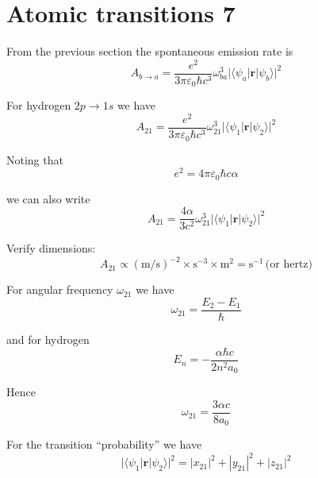 

\section*{Atomic transitions 7}

From the previous section the spontaneous emission rate is
\begin{equation*}
A_{b\rightarrow a}=\frac{e^2}{3\pi\varepsilon_0\hbar c^3}\omega_{ba}^3
\bigl|\langle\psi_a|\mathbf r|\psi_b\rangle\bigr|^2
\end{equation*}

For hydrogen $2p\rightarrow1s$ we have
\begin{equation*}
A_{21}=\frac{e^2}{3\pi\varepsilon_0\hbar c^3}\omega_{21}^3
\bigl|\langle\psi_1|\mathbf r|\psi_2\rangle\bigr|^2
\end{equation*}

Noting that
\begin{equation*}
e^2=4\pi\varepsilon_0\hbar c\alpha
\end{equation*}

we can also write
\begin{equation*}
A_{21}=\frac{4\alpha}{3c^2}\omega_{21}^3
\bigl|\langle\psi_1|\mathbf r|\psi_2\rangle\bigr|^2
\tag{1}
\end{equation*}

Verify dimensions:
\begin{equation*}
A_{21}\propto(\text{m/s})^{-2}\times\text{s}^{-3}\times\text{m}^2=\text{s}^{-1}\,\text{(or hertz)}
\end{equation*}

For angular frequency $\omega_{21}$ we have
\begin{equation*}
\omega_{21}=\frac{E_2-E_1}{\hbar}
\end{equation*}

and for hydrogen
\begin{equation*}
E_n=-\frac{\alpha\hbar c}{2n^2a_0}
\end{equation*}

Hence
\begin{equation*}
\omega_{21}=\frac{3\alpha c}{8a_0}
\end{equation*}

For the transition ``probability'' we have
\begin{equation*}
\bigl|\langle\psi_1|\mathbf r|\psi_2\rangle\bigr|^2
=|x_{21}|^2+|y_{21}|^2+|z_{21}|^2
\end{equation*}

